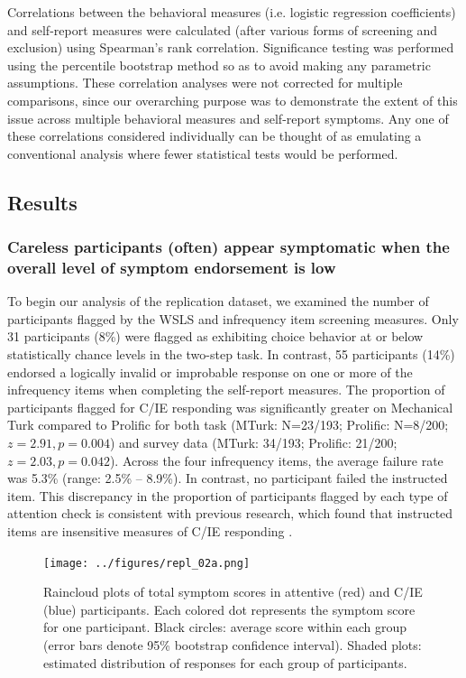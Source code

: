 \documentclass[a4paper,notitlepage,12pt]{article}
\begin{document}
\begin{refsection}[supp]
Correlations between the behavioral measures (i.e. logistic regression coefficients) and self-report measures were calculated (after various forms of screening and exclusion) using Spearman's rank correlation. Significance testing was performed using the percentile bootstrap method \cite{wilcox2018guide-2} so as to avoid making any parametric assumptions. These correlation analyses were not corrected for multiple comparisons, since our overarching purpose was to demonstrate the extent of this issue across multiple behavioral measures and self-report symptoms. Any one of these correlations considered individually can be thought of as emulating a conventional analysis where fewer statistical tests would be performed.

\subsection*{Results}

\subsubsection*{Careless participants (often) appear symptomatic when the overall level of symptom endorsement is low}

To begin our analysis of the replication dataset, we examined the number of participants flagged by the WSLS and infrequency item screening measures. Only 31 participants (8\%) were flagged as exhibiting choice behavior at or below statistically chance levels in the two-step task. In contrast, 55 participants (14\%) endorsed a logically invalid or improbable response on one or more of the infrequency items when completing the self-report measures. The proportion of participants flagged for C/IE responding was significantly greater on Mechanical Turk compared to Prolific for both task (MTurk: N=23/193; Prolific: N=8/200; $z=2.91, p=0.004$) and survey data (MTurk: 34/193; Prolific: 21/200; $z = 2.03, p = 0.042$). Across the four infrequency items, the average failure rate was 5.3\% (range: 2.5\% -- 8.9\%). In contrast, no participant failed the instructed item. This discrepancy in the proportion of participants flagged by each type of attention check is consistent with previous research, which found that instructed items are insensitive measures of C/IE responding \cite{barends2019noncompliant-2, thomas2017validity-2, hauser2016attentive-2}.   

\begin{figure}[t!]
\texttt{[image: ../figures/repl\_02a.png]}
\centering
\captionsetup{width=0.88\textwidth}
\caption{Raincloud plots of total symptom scores in attentive (red) and C/IE (blue) participants. Each colored dot represents the symptom score for one participant. Black circles: average score within each group (error bars denote 95\% bootstrap confidence interval). Shaded plots: estimated distribution of responses for each group of participants.}
\label{fig:repl_distributions}
\end{figure}


\end{refsection}
\end{document}
